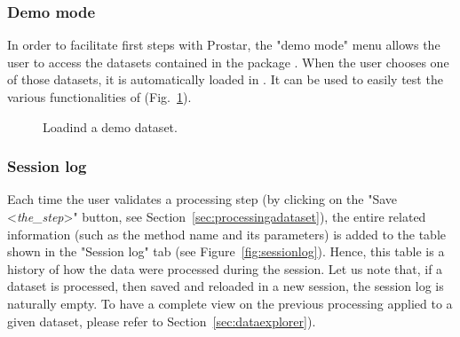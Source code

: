 \documentclass[12pt]{article}
\begin{document}
{\subsubsection{Demo mode} \label{sec:demomode}

In order to facilitate first steps with Prostar, the "demo mode" menu allows 
the user to access the datasets contained in the package . 
When the user chooses one of those datasets, it is automatically loaded in 
. It can be used to easily test the various functionalities of
 (Fig.~\ref{fig:demomodeFig}).



\begin {figure}
\centering
{}
\caption{Loadind a demo dataset.}\label{fig:demomodeFig}
\end {figure}


\subsubsection{Session log}\label{sec:sessionlog}

Each time the user validates a processing step (by clicking on the 
"Save <\emph{the\_step}>" button, see Section~\ref{sec:processingadataset}), 
the entire related information  (such as the method name and its parameters) 
is added to the table shown in the "Session log" tab 
(see Figure~\ref{fig:sessionlog}). Hence, this table is a history of how the 
data were processed during the session. 
Let us note that, if a dataset is processed, then saved and reloaded in a 
new session, the session log is naturally empty. To have a complete view on 
the previous processing applied to a given dataset, please refer to 
Section~\ref{sec:dataexplorer}).

}
\end{document}
